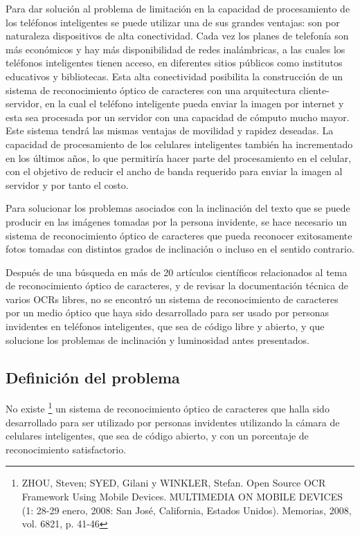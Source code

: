 \documentclass[a4paper, 11pt, oneside]{report}
\begin{document}
Para dar solución al problema de limitación en la capacidad de procesamiento de los teléfonos inteligentes se puede utilizar una de sus grandes ventajas: son por naturaleza dispositivos de alta conectividad. Cada vez los planes de telefonía son más económicos y hay más disponibilidad de redes inalámbricas, a las cuales los teléfonos inteligentes tienen acceso, en diferentes sitios públicos como institutos educativos y bibliotecas. Esta alta conectividad posibilita la construcción de un sistema de reconocimiento óptico de caracteres con una arquitectura cliente-servidor, en la cual el teléfono inteligente pueda enviar la imagen por internet y esta sea procesada por un servidor con una capacidad de cómputo mucho mayor. Este sistema tendrá las mismas ventajas de movilidad y rapidez deseadas. La capacidad de procesamiento de los celulares inteligentes también ha incrementado en los últimos años, lo que permitiría hacer parte del procesamiento en el celular, con el objetivo de reducir el ancho de banda requerido para enviar la imagen al servidor y por tanto el costo.

Para solucionar los problemas asociados con la inclinación del texto que se puede producir en las imágenes tomadas por la persona invidente, se hace necesario un sistema de reconocimiento óptico de caracteres que pueda reconocer exitosamente fotos tomadas con distintos grados de inclinación o incluso en el sentido contrario.

Después de una búsqueda en más de 20 artículos científicos relacionados al tema de reconocimiento óptico de caracteres, y de revisar la documentación técnica de varios OCRs libres, no se encontró un sistema de reconocimiento de caracteres por un medio óptico que haya sido desarrollado para ser usado por personas invidentes en teléfonos inteligentes, que sea de código libre y abierto, y que solucione los problemas de inclinación y luminosidad antes presentados. 

\subsection{Definición del problema}

No existe \footnote{ZHOU, Steven; SYED, Gilani y WINKLER, Stefan. Open Source OCR Framework Using Mobile Devices. MULTIMEDIA ON MOBILE DEVICES (1: 28-29 enero, 2008: San José, California, Estados Unidos). Memorias, 2008, vol. 6821, p. 41-46} un sistema de reconocimiento óptico de caracteres que halla sido desarrollado para ser utilizado por personas invidentes utilizando la cámara de celulares inteligentes, que sea de código abierto, y con un porcentaje de reconocimiento satisfactorio.
\end{document}
